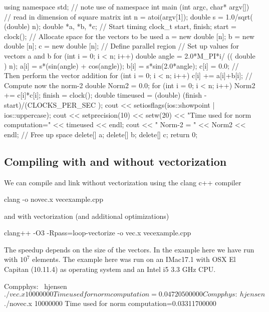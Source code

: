 \documentclass[%
oneside,                 %
final,                   %
10pt]{article}
\begin{document}
using namespace std; // note use of namespace
int main (int argc, char* argv[])
{
  // read in dimension of square matrix
  int n = atoi(argv[1]);
  double s = 1.0/sqrt( (double) n);
  double *a, *b, *c;
  // Start timing
  clock_t start, finish;
  start = clock();
// Allocate space for the vectors to be used
    a = new double [n]; b = new double [n]; c = new double [n];
  // Define parallel region
  // Set up values for vectors  a and b
  for (int i = 0; i < n; i++){
    double angle = 2.0*M_PI*i/ (( double ) n);
    a[i] = s*(sin(angle) + cos(angle));
    b[i] =  s*sin(2.0*angle);
    c[i] = 0.0;
  }
  // Then perform the vector addition
  for (int i = 0; i < n; i++){
    c[i] += a[i]+b[i];
  }
  // Compute now the norm-2
  double Norm2 = 0.0;
  for (int i = 0; i < n; i++){
    Norm2  += c[i]*c[i];
  }
  finish = clock();
  double timeused = (double) (finish - start)/(CLOCKS_PER_SEC );
  cout << setiosflags(ios::showpoint | ios::uppercase);
  cout << setprecision(10) << setw(20) << "Time used  for norm computation=" << timeused  << endl;
  cout << "  Norm-2  = " << Norm2 << endl;
  // Free up space
  delete[] a;
  delete[] b;
  delete[] c;
  return 0;
}





\ecppcode


\subsection{Compiling with and without vectorization}
We can compile and link without vectorization using the clang c++ compiler


\bcppcod
clang -o novec.x vecexample.cpp

\ecppcod

and with vectorization (and additional optimizations)


\bcppcod
clang++ -O3 -Rpass=loop-vectorize -o  vec.x vecexample.cpp 

\ecppcod

The speedup depends on the size of the vectors. In the example here we have run with $10^7$ elements.
The example here was run on an IMac17.1 with OSX El Capitan (10.11.4) as operating system and an Intel i5 3.3 GHz CPU.  





\bcppcod
Compphys:~ hjensen$ ./vec.x 10000000
Time used  for norm computation=0.04720500000
Compphys:~ hjensen$ ./novec.x 10000000
Time used  for norm computation=0.03311700000
\end{document}
